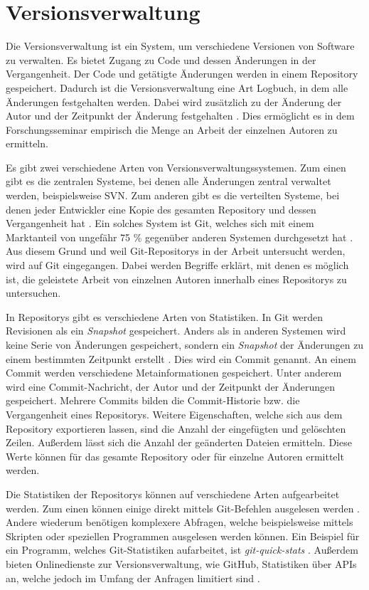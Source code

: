 \section{Versionsverwaltung}
\label{sec:versionsverwaltung}
Die Versionsverwaltung ist ein System, um verschiedene Versionen von Software zu verwalten.
Es bietet Zugang zu Code und dessen Änderungen in der Vergangenheit.
Der Code und getätigte Änderungen werden in einem Repository gespeichert.
Dadurch ist die Versionsverwaltung eine Art Logbuch, in dem alle Änderungen festgehalten werden.
Dabei wird zusätzlich zu der Änderung der Autor und der Zeitpunkt der Änderung festgehalten \autocite{ponuthorai_version_2022}.
Dies ermöglicht es in dem Forschungsseminar empirisch die Menge an Arbeit der einzelnen Autoren zu ermitteln.

Es gibt zwei verschiedene Arten von Versionsverwaltungssystemen.
Zum einen gibt es die zentralen Systeme, bei denen alle Änderungen zentral verwaltet werden, beispielsweise SVN.
Zum anderen gibt es die verteilten Systeme, bei denen jeder Entwickler eine Kopie des gesamten Repository und dessen Vergangenheit hat \autocite{ponuthorai_version_2022}.
Ein solches System ist Git, welches sich mit einem Marktanteil von ungefähr 75 \% gegenüber anderen Systemen durchgesetzt hat \autocite{lindner_version_2024}.
Aus diesem Grund und weil Git-Repositorys in der Arbeit untersucht werden, wird auf Git eingegangen.
Dabei werden Begriffe erklärt, mit denen es möglich ist, die geleistete Arbeit von einzelnen Autoren innerhalb eines Repositorys zu untersuchen.

In Repositorys gibt es verschiedene Arten von Statistiken.
In Git werden Revisionen als ein \emph{Snapshot} gespeichert.
Anders als in anderen Systemen wird keine Serie von Änderungen gespeichert, sondern ein \emph{Snapshot} der Änderungen zu einem bestimmten Zeitpunkt erstellt \autocite{ponuthorai_version_2022}.
Dies wird ein Commit genannt.
An einem Commit werden verschiedene Metainformationen gespeichert.
Unter anderem wird eine Commit-Nachricht, der Autor und der Zeitpunkt der Änderungen gespeichert.
Mehrere Commits bilden die Commit-Historie bzw. die Vergangenheit eines Repositorys.
Weitere Eigenschaften, welche sich aus dem Repository exportieren lassen, sind die Anzahl der eingefügten und gelöschten Zeilen.
Außerdem lässt sich die Anzahl der geänderten Dateien ermitteln.
Diese Werte können für das gesamte Repository oder für einzelne Autoren ermittelt werden.

Die Statistiken der Repositorys können auf verschiedene Arten aufgearbeitet werden.
Zum einen können einige direkt mittels Git-Befehlen ausgelesen werden \autocite{chacon_git_2024}.
Andere wiederum benötigen komplexere Abfragen, welche beispielsweise mittels Skripten oder speziellen Programmen ausgelesen werden können.
Ein Beispiel für ein Programm, welches Git-Statistiken aufarbeitet, ist \emph{git-quick-stats} \autocite{mestan_git-quick-stats_2024}.
Außerdem bieten Onlinedienste zur Versionsverwaltung, wie GitHub, Statistiken über APIs an, welche jedoch im Umfang der Anfragen limitiert sind \autocite{github_rate_2022}.
